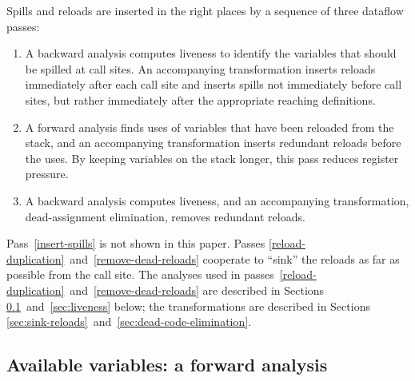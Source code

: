 \documentclass[blockstyle,preprint,natbib,nocopyrightspace]{sigplanconf}
\newcommand{\authornote}[1]{{\em #1}}
\def\authornote#1{\unskip\relax}
\newcommand{\simon}[1]{\authornote{SLPJ: #1}}
\newcommand\secreftwo[2]{Sections \ref{sec:#1}~and~\ref{sec:#2}}
\newcommand\seclabel[1]{\label{sec:#1}}
\begin{document}
Spills and reloads are inserted in the right places
by a sequence of three dataflow passes:
\begin{enumerate}
\item
\label{insert-spills}
A backward analysis computes liveness
to identify the variables that should be spilled at call sites.
An accompanying transformation inserts reloads immediately after each call
site and inserts spills not immediately before call sites, but
rather immediately after the appropriate reaching definitions.
\item
\label{reload-duplication}
A forward analysis finds uses of variables that have been reloaded
from the stack, and an accompanying transformation
inserts redundant reloads before the uses.
By keeping variables on the stack longer, this pass reduces register pressure.
\item
\label{remove-dead-reloads}
A backward analysis computes liveness,
and an accompanying transformation, dead-assignment elimination,
removes redundant reloads.
\end{enumerate}
Pass~\ref{insert-spills} is not shown in this paper.
Passes
\ref{reload-duplication}~and~\ref{remove-dead-reloads} cooperate to ``sink''
the reloads as far as possible from the call site.
The analyses used in
passes~\ref{reload-duplication}~and~\ref{remove-dead-reloads}
are described in \secreftwo{avail}{liveness} below;
the transformations are described in
\secreftwo{sink-reloads}{dead-code-elimination}.




\subsection{Available variables: a forward analysis} 

\seclabel{avail}
\end{document}

